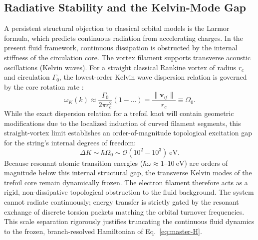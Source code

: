 \documentclass[11pt,a4paper]{article}
\newcommand{\rc}{r_c}
\begin{document}
    \subsection{Radiative Stability and the Kelvin-Mode Gap}
        A persistent structural objection to classical orbital models is the Larmor formula, which predicts continuous radiation from accelerating charges. In the present fluid framework, continuous dissipation is obstructed by the internal stiffness of the circulation core. The vortex filament supports transverse acoustic oscillations (Kelvin waves). For a straight classical Rankine vortex of radius $\rc$ and circulation $\Gamma_0$, the lowest-order Kelvin wave dispersion relation is governed by the core rotation rate \cite{Kelvin1880}:
        \begin{equation}
            \label{eq:KelvinDispersion}
            \omega_K(k) \approx \frac{\Gamma_0}{2\pi \rc^2} \left(1 - \dots \right) = \frac{\lVert \mathbf{v}_{\!\boldsymbol{\circlearrowleft}}\rVert}{\rc} \equiv \Omega_0.
        \end{equation}
        While the exact dispersion relation for a trefoil knot will contain geometric modifications due to the localized induction of curved filament segments, this straight-vortex limit establishes an order-of-magnitude topological excitation gap for the string's internal degrees of freedom:
        \begin{equation}
            \label{eq:KelvinGap}
            \Delta K \sim \hbar \Omega_0 \sim \mathcal{O}(10^2 - 10^3)\ \mathrm{eV}.
        \end{equation}
        Because resonant atomic transition energies ($\hbar\omega \approx 1\text{--}10\ \mathrm{eV}$) are orders of magnitude below this internal structural gap, the transverse Kelvin modes of the trefoil core remain dynamically frozen. The electron filament therefore acts as a rigid, non-dissipative topological obstruction to the fluid background. The system cannot radiate continuously; energy transfer is strictly gated by the resonant exchange of discrete torsion packets matching the orbital turnover frequencies. This scale separation rigorously justifies truncating the continuous fluid dynamics to the frozen, branch-resolved Hamiltonian of Eq.~\eqref{eq:master-H}.
    
\end{document}
